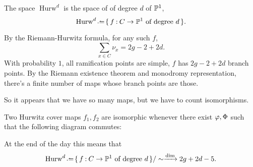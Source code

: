 \documentclass[12pt]{memoir}
\begin{document}
\begin{Def}
    The space $\operatorname{Hurw}^d$ is the space of  of degree $d$ of $\mathbb{P}^1$,
    $$\operatorname{Hurw}^d\defeq\set{f\: C\to\bP^1\text{ of degree }d}.$$
\end{Def}

By the Riemann-Hurwitz formula, for any such $f$,
$$\sum_{x\in C}\nu_x=2g-2+2d.$$
With probability $1$, all ramification points are simple, $f$ has $2g-2+2d$ branch points. By the Riemann existence theorem and monodromy representation, there's a finite number of maps whose branch points are those.\par
So it appears that we have so many maps, but we have to count isomorphisms.

\begin{Def}
    Two Hurwitz cover maps $f_1,f_2$ are isomorphic whenever there exist $\varphi,\Phi$ such that the following diagram commutes:
    \begin{center}
    \end{center}
\end{Def}

At the end of the day this means that 
$$\operatorname{Hurw}^d\defeq\set{f\: C\to\bP^1\text{ of degree }d}/\sim\xrightarrow{\dim}2g+2d-5.$$



\ifx\nextra\undefined
\printindex
\else\fi
\nocite{*}


\end{document}
